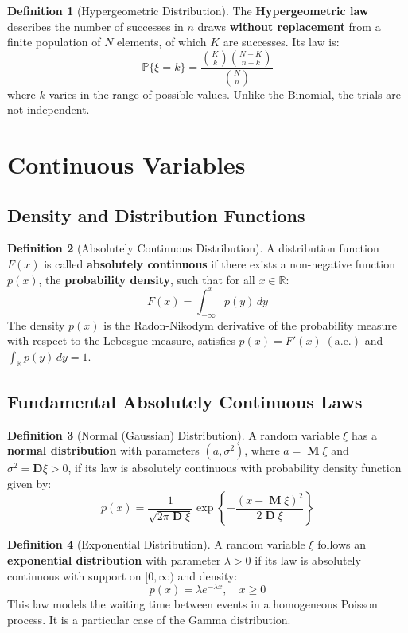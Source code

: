 \documentclass[12pt, openany]{book}
\theoremstyle{definition}
\newtheorem{definition}{Definition}[section]
\theoremstyle{plain}
\theoremstyle{remark}
\newcommand{\R}{\mathbb{R}}
\newcommand{\probP}{\mathbb{P}}
\DeclareMathOperator{\M}{\mathbf{M}} %
\DeclareMathOperator{\D}{\mathbf{D}} %
\begin{document}
\begin{definition}[Hypergeometric Distribution]
The \textbf{Hypergeometric law} describes the number of successes in $n$ draws \textbf{without replacement} from a finite population of $N$ elements, of which $K$ are successes. Its law is:
$$ \probP\{\xi=k\} = \frac{\binom{K}{k} \binom{N-K}{n-k}}{\binom{N}{n}} $$
where $k$ varies in the range of possible values. Unlike the Binomial, the trials are not independent.
\end{definition}

\section{Continuous Variables}

\subsection{Density and Distribution Functions}

\begin{definition}[Absolutely Continuous Distribution]
A distribution function $F(x)$ is called \textbf{absolutely continuous} if there exists a non-negative function $p(x)$, the \textbf{probability density}, such that for all $x \in \R$:
$$ F(x) = \int_{-\infty}^{x} p(y) \,dy $$
The density $p(x)$ is the Radon-Nikodym derivative of the probability measure with respect to the Lebesgue measure, satisfies $p(x) = F'(x)  \; (\text{a.e.})$ and $\int_{\mathbb{R}} p(y) \,dy = 1$.
\end{definition}

\subsection{Fundamental Absolutely Continuous Laws}

\begin{definition}[Normal (Gaussian) Distribution]
A random variable $\xi$ has a \textbf{normal distribution} with parameters $(a, \sigma^2)$, where $a = \M\xi$ and $\sigma^2 = \textbf{D} \xi > 0$, if its law is absolutely continuous with probability density function given by:
$$ p(x) = \frac{1}{\sqrt{2\pi \D\xi}} \exp\left\{-\frac{(x-\M\xi)^2}{2\D\xi}\right\} $$
\end{definition}

\begin{definition}[Exponential Distribution]
A random variable $\xi$ follows an \textbf{exponential distribution} with parameter $\lambda > 0$ if its law is absolutely continuous with support on $[0, \infty)$ and density:
$$ p(x) = \lambda e^{-\lambda x}, \quad x \ge 0 $$
This law models the waiting time between events in a homogeneous Poisson process. It is a particular case of the Gamma distribution.
\end{definition}
\end{document}

